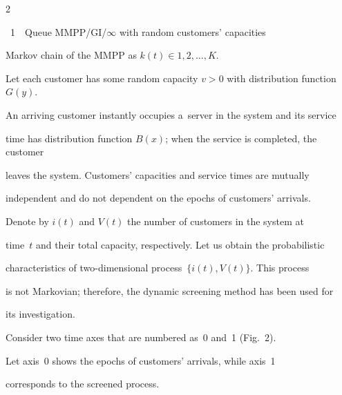 \begin{multicols}{2}
{\noindent


{{\figurename~1}\ \ \small{Queue MMPP/GI/$\infty$ with random customers' capacities}}


}





\vspace*{9pt}





\addtocounter{figure}{1}











\noindent


 Markov chain of the MMPP as $k(t) \in 1,2,\ldots,K$. 


Let each customer has some random capacity $v>0$ with distribution function~$G(y)$. 


An arriving customer instantly occupies a~server in the system and its service 


time has distribution function $B(x)$; when the service is completed, the customer 


leaves the system. Customers' capacities and service times are mutually 


independent and do not dependent on the epochs of customers' arrivals.





 








Denote by $i(t)$ and $V(t)$ the number of customers in the system at 


time~$t$ and their total capacity, respectively. Let us obtain the probabilistic 


characteristics of two-dimensional process~$\{i(t),V(t)\}$. This process 


is not Markovian; therefore,  the dynamic screening method has been used for 


its investigation.





Consider two time axes that are numbered as~0 and~1 (Fig.~2). 


Let axis~0 shows the epochs of customers' arrivals, while axis~1 


corresponds to the screened process.












\end{multicols}
